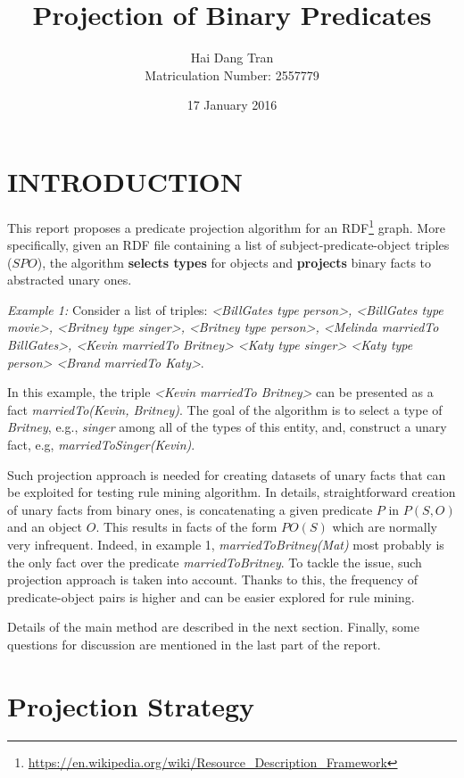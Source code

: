 \documentclass{acm_proc_article-sp}
\begin{document}
\title{Projection of Binary Predicates}
\author{
\alignauthor
Hai Dang Tran\\Matriculation Number: 2557779
}
\date{17 January 2016}

\maketitle

\section{INTRODUCTION}
This report proposes a predicate projection algorithm for an RDF\footnote{\url{https://en.wikipedia.org/wiki/Resource_Description_Framework}} graph. More specifically, given an RDF file containing a list of subject-predicate-object triples ($SPO$), the algorithm \textbf{selects types} for objects and \textbf{projects} binary facts to abstracted unary ones.

\textit{Example 1:} Consider a list of triples: \textit{<BillGates type person>, <BillGates type movie>, <Britney type singer>, <Britney type person>, <Melinda marriedTo BillGates>, <Kevin marriedTo Britney> <Katy type singer> <Katy type person> <Brand marriedTo Katy>}.

In this example, the triple \textit{<Kevin marriedTo Britney>} can be presented as a fact \textit{marriedTo(Kevin, Britney)}. The goal of the algorithm is to select a type of \textit{Britney}, e.g., \textit{singer} among all of the types of this entity, and, construct a unary fact, e.g, \textit{marriedToSinger(Kevin)}.

Such projection approach is needed for creating datasets of unary facts that can be exploited for testing rule mining algorithm. In details, straightforward creation of unary facts from binary ones, is concatenating a given predicate $P$ in $P(S, O)$ and an object $O$. This results in facts of the form $PO(S)$ which are normally very infrequent. Indeed, in example 1, \textit{marriedToBritney(Mat)} most probably is the only fact over the predicate \textit{marriedToBritney}. To tackle the issue, such projection approach is taken into account. Thanks to this, the frequency of predicate-object pairs is higher and can be easier explored for rule mining.

Details of the main method are described in the next section. Finally, some questions for discussion are mentioned in the last part of the report.

\section{Projection Strategy}
\end{document}

